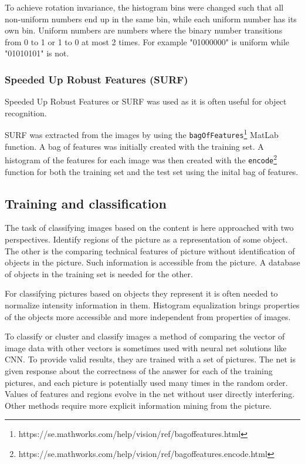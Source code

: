 \documentclass[doc/report.tex]{subfiles}
\begin{document}
To achieve rotation invariance, the histogram bins were changed such that all
non-uniform numbers end up in the same bin, while each uniform number has its
own bin. Uniform numbers are numbers where the binary number transitions from 0
to 1 or 1 to 0 at most 2 times. For example "01000000" is uniform while
"01010101" is not.

\subsubsection{Speeded Up Robust Features (SURF)}
Speeded Up Robust Features or SURF was used as it is often useful for object
recognition.

SURF was extracted from the images by using the
\texttt{bagOfFeatures}\footnote{https://se.mathworks.com/help/vision/ref/bagoffeatures.html}
MatLab function. A bag of features was initially created with the training set.
A histogram of the features for each image was then created with the
\texttt{encode}\footnote{https://se.mathworks.com/help/vision/ref/bagoffeatures.encode.html}
function for both the training set and the test set using the inital bag of
features.




\subsection{Training and classification}
The task of classifying images based on the content is here approached with two
perspectives. Identify regions of the picture as a representation of some
object. The other is the comparing technical features of picture without
identification of objects in the picture. Such information is accessible from
the picture. A database of objects in the training set is needed for the other.

For classifying pictures based on objects they represent it is often needed to
normalize intensity information in them. Histogram equalization brings
properties of the objects more accessible and more independent from properties
of images.

To classify or cluster and classify images a method of comparing the vector of
image data with other vectors is sometimes used with neural net solutions like
CNN. To provide valid results, they are trained with a set of pictures. The net
is given response about the correctness of the answer for each of the training
pictures, and each picture is potentially used many times in the random order.
Values of features and regions evolve in the net without user directly
interfering. Other methods require more explicit information mining from the
picture.
\end{document}

